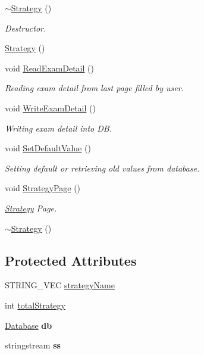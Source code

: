 \begin{DoxyCompactItemize}
\item 
\hyperlink{classStrategy_a37c0bbdd64fd7dfcdd91578784a64775}{$\sim$\-Strategy} ()
\begin{DoxyCompactList}\small\item\em Destructor. \end{DoxyCompactList}\item 
\hyperlink{classStrategy_a2021a15bbc4f0d13f7b92f8933db2235}{Strategy} ()
\item 
void \hyperlink{classStrategy_abb7a716f8403d4ec3d5d127f789ba6ba}{Read\-Exam\-Detail} ()
\begin{DoxyCompactList}\small\item\em Reading exam detail from last page filled by user. \end{DoxyCompactList}\item 
void \hyperlink{classStrategy_a3825da44242fdf8442ffbd9cfd922803}{Write\-Exam\-Detail} ()
\begin{DoxyCompactList}\small\item\em Writing exam detail into D\-B. \end{DoxyCompactList}\item 
void \hyperlink{classStrategy_a5ae1ee77d05ad12afedef648f583328a}{Set\-Default\-Value} ()
\begin{DoxyCompactList}\small\item\em Setting default or retrieving old values from database. \end{DoxyCompactList}\item 
void \hyperlink{classStrategy_ac3f851b75390a71e3a4c6dfd9b15dafb}{Strategy\-Page} ()
\begin{DoxyCompactList}\small\item\em \hyperlink{classStrategy}{Strategy} Page. \end{DoxyCompactList}\item 
\hyperlink{classStrategy_a37c0bbdd64fd7dfcdd91578784a64775}{$\sim$\-Strategy} ()
\end{DoxyCompactItemize}
\subsection*{Protected Attributes}
\begin{DoxyCompactItemize}
\item 
S\-T\-R\-I\-N\-G\-\_\-\-V\-E\-C \hyperlink{classStrategy_ae6c656d6bf12b37ad7ddf523b1eb1123}{strategy\-Name}
\item 
int \hyperlink{classStrategy_ace5cccbe2419bb086f0e0e5dd481b298}{total\-Strategy}
\item 
\hypertarget{classStrategy_a542e7c73e393d4bfb1c11a2c243a21b3}{\hyperlink{classDatabase}{Database} {\bfseries db}}\label{classStrategy_a542e7c73e393d4bfb1c11a2c243a21b3}

\item 
\hypertarget{classStrategy_a190510a0a4957ac947ce5a09d2f7dad8}{stringstream {\bfseries ss}}\label{classStrategy_a190510a0a4957ac947ce5a09d2f7dad8}

\end{DoxyCompactItemize}
